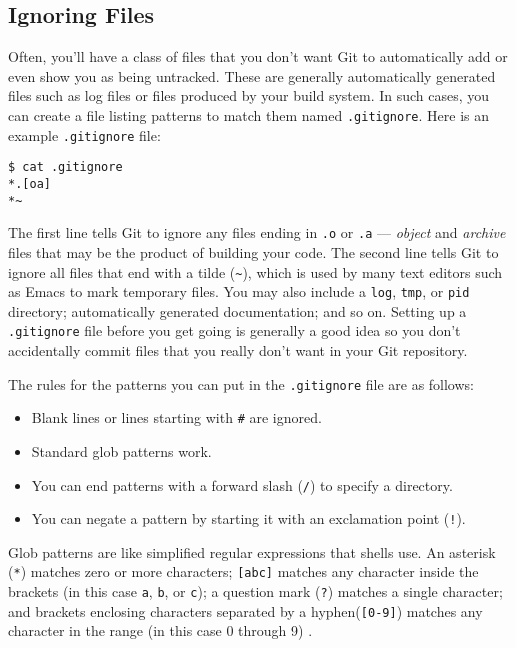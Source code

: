 \documentclass[a4paper]{book}
\begin{document}
\subsection{Ignoring Files}

Often, you'll have a class of files that you don't want Git to automatically add or even show you as being untracked. These are generally automatically generated files such as log files or files produced by your build system. In such cases, you can create a file listing patterns to match them named \texttt{.gitignore}. Here is an example \texttt{.gitignore} file:

\begin{shaded}\begin{verbatim}
$ cat .gitignore
*.[oa]
*~
\end{verbatim}\end{shaded}

The first line tells Git to ignore any files ending in \texttt{.o} or \texttt{.a} --- \emph{object} and \emph{archive} files that may be the product of building your code. The second line tells Git to ignore all files that end with a tilde (\texttt{\textasciitilde{}}), which is used by many text editors such as Emacs to mark temporary files. You may also include a \texttt{log}, \texttt{tmp}, or \texttt{pid} directory; automatically generated documentation; and so on. Setting up a \texttt{.gitignore} file before you get going is generally a good idea so you don't accidentally commit files that you really don't want in your Git repository.

The rules for the patterns you can put in the \texttt{.gitignore} file are as follows:

\begin{itemize}
\itemsep1pt\parskip0pt
\item
  Blank lines or lines starting with \texttt{\#} are ignored.
\item
  Standard glob patterns work.
\item
  You can end patterns with a forward slash (\texttt{/}) to specify a directory.
\item
  You can negate a pattern by starting it with an exclamation point (\texttt{!}).
\end{itemize}

Glob patterns are like simplified regular expressions that shells use. An asterisk (\texttt{*}) matches zero or more characters; \texttt{{[}abc{]}} matches any character inside the brackets (in this case \texttt{a}, \texttt{b}, or \texttt{c}); a question mark (\texttt{?}) matches a single character; and brackets enclosing characters separated by a hyphen(\texttt{{[}0-9{]}}) matches any character in the range (in this case 0 through 9) .
\end{document}
